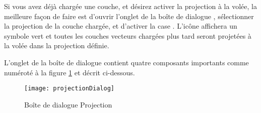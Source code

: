 Si vous avez déjà chargée une couche, et désirez activer la projection à la
volée, la meilleure façon de faire est d'ouvrir l'onglet  de la boîte de dialogue , sélectionner la projection de la couche chargée, et d'activer la case
. L'icône
 affichera un symbole vert et
toutes les couches vecteurs chargées plus tard seront projetées à la volée dans
la projection définie.

L'onglet  de la boîte de dialogue
 contient quatre composants importants comme
numéroté à la figure \ref{fig:projections} et décrit ci-dessous.

\begin{figure}[ht]
   \begin{center}
   \caption{Boîte de dialogue
Projection\nixcaption}\label{fig:projections}\smallskip
   \texttt{[image: projectionDialog]}
\end{center}
\end{figure}

